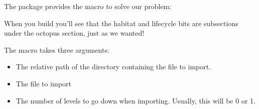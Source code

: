 
The  package provides the  macro to solve our problem:


When you build  you'll see that the habitat and lifecycle bits are subsections under the octopus section, just as we wanted!

The  macro takes three arguments:
\begin{itemize}
  \item The relative path of the directory containing the file to import.
  \item The file to import
  \item The number of levels to go down when importing. Usually, this will be 0 or 1.
\end{itemize}

